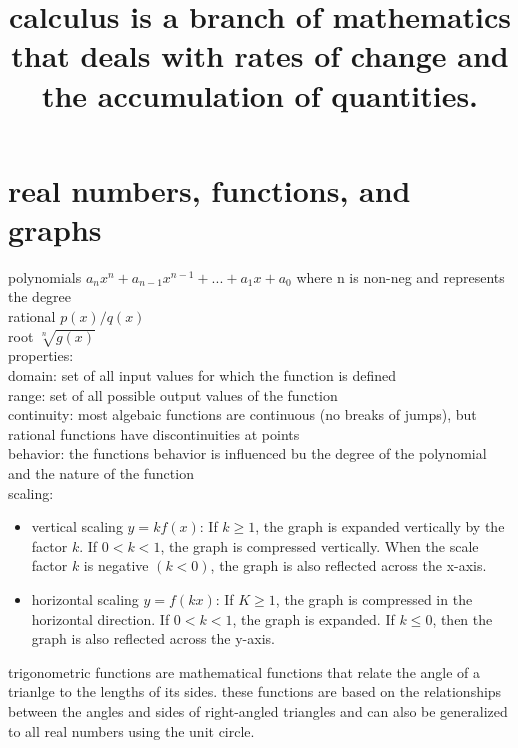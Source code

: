 \documentclass{article}
\begin{document}
\title{calculus is a branch of mathematics that deals with rates of change and the accumulation of quantities.}

\maketitle

\section*{real numbers, functions, and graphs}

	polynomials $a_nx^n + a_{n-1}x^{n-1} + ... + a_1x + a_0$ where n is non-neg and represents the degree\\

	rational $p(x)/q(x)$\\

	root $\sqrt[n]{g(x)}$\\

	properties:\\
		domain: set of all input values for which the function is defined\\
		range: set of all possible output values of the function\\
	
		continuity: most algebaic functions are continuous (no breaks of jumps), but rational functions have discontinuities at points\\
		
		behavior: the functions behavior is influenced bu the degree of the polynomial and the nature of the function\\


	scaling:\\
		\begin{itemize}
		\item{vertical scaling}
			$y = kf(x)$: If $k \geq 1$, the graph is expanded vertically by the factor $k$. If $0 < k < 1$, the graph is compressed vertically. When the scale factor $k$ is negative $(k < 0)$, the graph is also reflected across the x-axis.
		\item{horizontal scaling}
			$y = f(kx)$: If $K \geq 1$, the graph is compressed in the horizontal direction. If $0 < k < 1$, the graph is expanded. If $k \leq 0$, then the graph is also reflected across the y-axis.
		\end{itemize}

trigonometric functions are mathematical functions that relate the angle of a trianlge to the lengths of its sides. these functions are based on the relationships between the angles and sides of right-angled triangles and can also be generalized to all real numbers using the unit circle.\\
\end{document}
